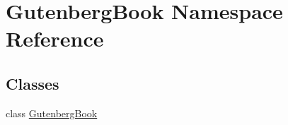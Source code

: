 \hypertarget{namespace_gutenberg_book}{}\section{Gutenberg\+Book Namespace Reference}
\label{namespace_gutenberg_book}
\subsection*{Classes}
\begin{DoxyCompactItemize}
\item 
class \hyperlink{class_gutenberg_book_1_1_gutenberg_book}{Gutenberg\+Book}
\end{DoxyCompactItemize}
